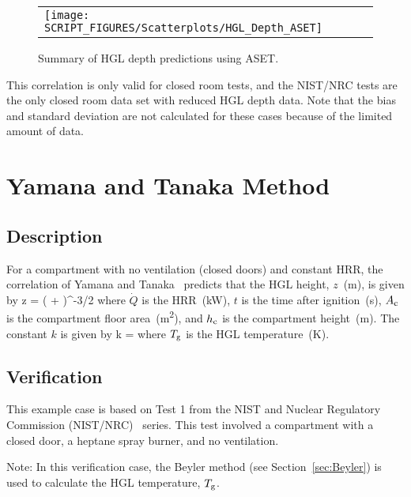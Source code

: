 \begin{figure}[!ht]
\begin{center}
\begin{tabular}{l}
\texttt{[image: SCRIPT\_FIGURES/Scatterplots/HGL\_Depth\_ASET]}
\end{tabular}
\end{center}
\caption[Summary of HGL depth predictions (ASET)]
{Summary of HGL depth predictions using ASET.}
\label{HGL_Depth_ASET}
\end{figure}

This correlation is only valid for closed room tests, and the NIST/NRC tests are the only closed room data set with reduced HGL depth data. Note that the bias and standard deviation are not calculated for these cases because of the limited amount of data.


\clearpage


\section{Yamana and Tanaka Method}
\label{sec:YT}

\subsection*{Description}

For a compartment with no ventilation (closed doors) and constant HRR, the correlation of Yamana and Tanaka~\cite{Tanaka:1} predicts that the HGL height, $z$~(\si{m}), is given by
\be
z = \left(  +  \right)^{-3/2}
\label{eq:Yamana_Tanaka}
\ee
where $\dot Q$ is the HRR~(\si{kW}), $t$ is the time after ignition~(\si{s}), $A\sb{c}$ is the compartment floor area~(\si{m^2}), and $h\sb{c}$ is the compartment height~(\si{m}). The constant $k$ is given by
\be
k = 
\ee
where $T\sb{g}$ is the HGL temperature~(\si{K}).


\clearpage


\subsection*{Verification}

This example case is based on Test 1 from the NIST and Nuclear Regulatory Commission (NIST/NRC)~\cite{Hamins:SP1013-1} series. This test involved a compartment with a closed door, a heptane spray burner, and no ventilation.

Note: In this verification case, the Beyler method (see Section~\ref{sec:Beyler}) is used to calculate the HGL temperature, $T\sb{g}$.


